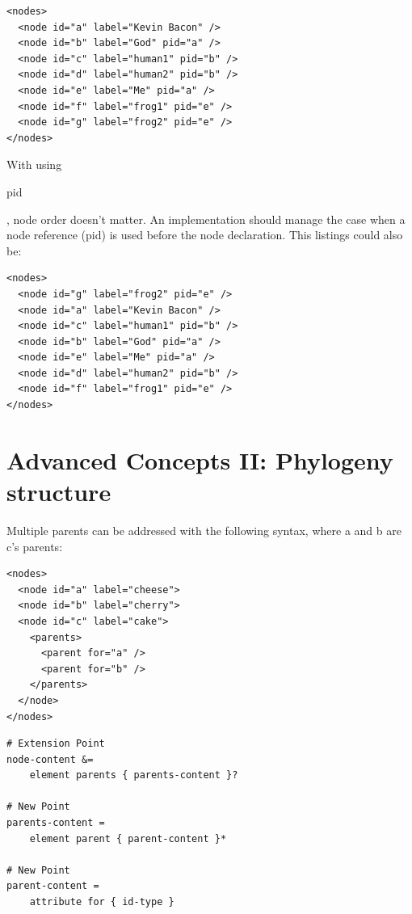 \documentclass[a4paper,10pt]{article}
\begin{document}
\lstset{ style=gexf }
\begin{lstlisting}[caption={Second way},label=hierarchy2]
<nodes>
  <node id="a" label="Kevin Bacon" />
  <node id="b" label="God" pid="a" />
  <node id="c" label="human1" pid="b" />
  <node id="d" label="human2" pid="b" />
  <node id="e" label="Me" pid="a" />
  <node id="f" label="frog1" pid="e" />
  <node id="g" label="frog2" pid="e" />
</nodes>
\end{lstlisting}

With using \begin{footnotesize}pid\end{footnotesize}, node order doesn't matter. An implementation should manage the case when a node reference (pid) is used before the node declaration. This listings could also be:

\lstset{ style=gexf }
\begin{lstlisting}[caption={Second way randomized},label=hierarchy22]
<nodes>
  <node id="g" label="frog2" pid="e" />
  <node id="a" label="Kevin Bacon" />
  <node id="c" label="human1" pid="b" />
  <node id="b" label="God" pid="a" />
  <node id="e" label="Me" pid="a" />
  <node id="d" label="human2" pid="b" />
  <node id="f" label="frog1" pid="e" />
</nodes>
\end{lstlisting}


\section{Advanced Concepts II: Phylogeny structure} \label{phylogeny}

Multiple parents can be addressed with the following syntax, where a and b are c's parents:
\lstset{ style=gexf }
\begin{lstlisting}[caption={Multiple parents},label=phylogeny1]
<nodes>
  <node id="a" label="cheese">
  <node id="b" label="cherry">
  <node id="c" label="cake">
    <parents>
      <parent for="a" />
      <parent for="b" />
    </parents>
  </node>
</nodes>
\end{lstlisting}

\lstset{ style=rnc }
\begin{lstlisting}[caption={Phylogeny Specification},label=phylogenyRNC]
# Extension Point
node-content &=
    element parents { parents-content }?

# New Point
parents-content =
    element parent { parent-content }*

# New Point
parent-content =
    attribute for { id-type }
\end{lstlisting}
\end{document}
